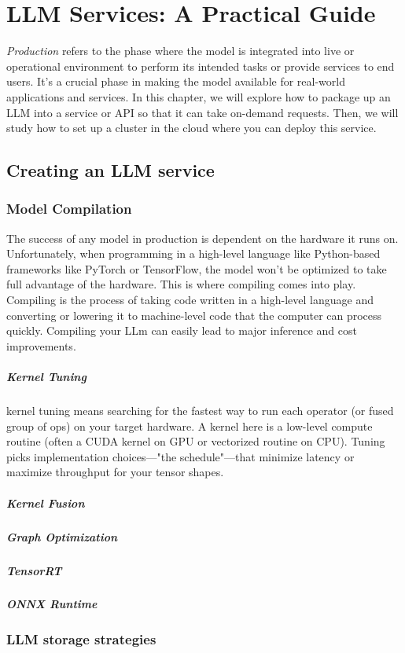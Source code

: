 \chapter{LLM Services: A Practical Guide}

\textit{Production} refers to the phase where the model is integrated into live or operational environment to perform its intended tasks or provide services to end users. It's a crucial phase in making the model available for real-world applications and services. In this chapter, we will explore how to package up an LLM into a service or API so that it can take on-demand requests. Then, we will study how to set up a cluster in the cloud where you can deploy this service. 

\section{Creating an LLM service}

\subsection{Model Compilation}
The success of any model in production is dependent on the hardware it runs on. Unfortunately, when programming in a high-level language like Python-based frameworks like PyTorch or TensorFlow, the model won't be optimized to take full advantage of the hardware. This is where compiling comes into play. Compiling is the process of taking code written in a high-level language and converting or lowering it to machine-level code that the computer can process quickly. Compiling your LLm can easily lead to major inference and cost improvements. 

\paragraph{Kernel Tuning} kernel tuning means searching for the fastest way to run each operator (or fused group of ops) on your target hardware. A kernel here is a low-level compute routine (often a CUDA kernel on GPU or vectorized routine on CPU). Tuning picks implementation choices—"the schedule"—that minimize latency or maximize throughput for your tensor shapes.

\paragraph{Kernel Fusion}
\paragraph{Graph Optimization}
\paragraph{TensorRT}
\paragraph{ONNX Runtime}

\subsection{LLM storage strategies}
